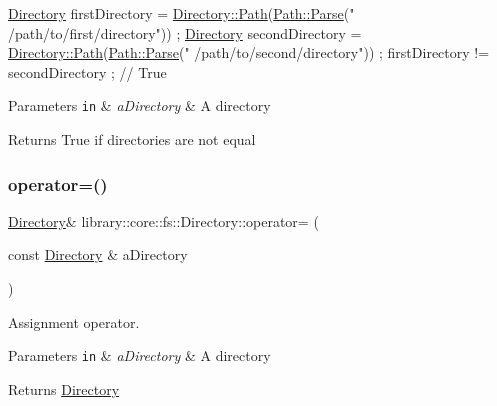 \begin{DoxyCode}
\hyperlink{classlibrary_1_1core_1_1fs_1_1_directory_a3ec39f6cad19a81d520e9a1f2d8bb1f7}{Directory} firstDirectory = \hyperlink{classlibrary_1_1core_1_1fs_1_1_directory_a6d3ea04654841e62a4dbd99feb563caf}{Directory::Path}(\hyperlink{classlibrary_1_1core_1_1fs_1_1_path_a6ba644b6609507e724c217bf2020f5ae}{Path::Parse}(\textcolor{stringliteral}{"
      /path/to/first/directory"})) ;
\hyperlink{classlibrary_1_1core_1_1fs_1_1_directory_a3ec39f6cad19a81d520e9a1f2d8bb1f7}{Directory} secondDirectory = \hyperlink{classlibrary_1_1core_1_1fs_1_1_directory_a6d3ea04654841e62a4dbd99feb563caf}{Directory::Path}(\hyperlink{classlibrary_1_1core_1_1fs_1_1_path_a6ba644b6609507e724c217bf2020f5ae}{Path::Parse}(\textcolor{stringliteral}{"
      /path/to/second/directory"})) ;
firstDirectory != secondDirectory ; \textcolor{comment}{// True}
\end{DoxyCode}



\begin{DoxyParams}[1]{Parameters}
\mbox{\tt in}  & {\em a\+Directory} & A directory \\
\hline
\end{DoxyParams}
\begin{DoxyReturn}{Returns}
True if directories are not equal 
\end{DoxyReturn}
\mbox{\label{classlibrary_1_1core_1_1fs_1_1_directory_ae49af93d5b45fd410634ab14d82a690a}} 
\subsubsection{\texorpdfstring{operator=()}{operator=()}}
{\footnotesize\ttfamily \hyperlink{classlibrary_1_1core_1_1fs_1_1_directory}{Directory}\& library\+::core\+::fs\+::\+Directory\+::operator= (\begin{DoxyParamCaption}\item[{const \hyperlink{classlibrary_1_1core_1_1fs_1_1_directory}{Directory} \&}]{a\+Directory }\end{DoxyParamCaption})}



Assignment operator. 


\begin{DoxyParams}[1]{Parameters}
\mbox{\tt in}  & {\em a\+Directory} & A directory \\
\hline
\end{DoxyParams}
\begin{DoxyReturn}{Returns}
\hyperlink{classlibrary_1_1core_1_1fs_1_1_directory}{Directory} 
\end{DoxyReturn}
\mbox{\label{classlibrary_1_1core_1_1fs_1_1_directory_a7d1a76c04ba3750606c3f22519d0ef66}} 
